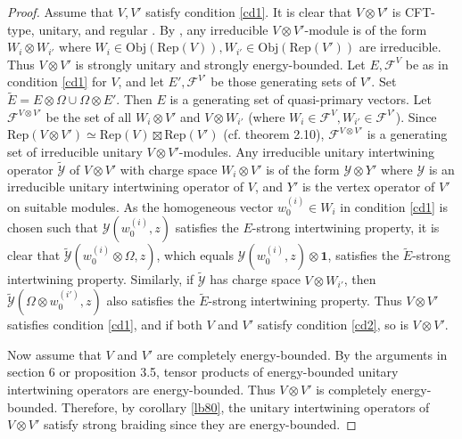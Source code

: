 \documentclass[11pt,b5paper,notitlepage]{article}
\theoremstyle{definition}
\theoremstyle{plain}
\newcommand{\mc}{\mathcal}
\newcommand{\wtd}{\widetilde}
\newcommand{\id}{\mathbf{1}}
\newcommand{\Rep}{\mathrm{Rep}}
\newcommand{\RepV}{\mathrm{Rep}(V)}
\newcommand{\Obj}{\mathrm{Obj}}
\numberwithin{equation}{subsection}
\begin{document}
\begin{proof}
Assume that $V,V'$ satisfy condition \ref{cd1}. It is clear that $V\otimes V'$ is CFT-type, unitary, and regular \cite{DLM97}. By \cite{FHL93}, any irreducible $V\otimes V'$-module is of the form $W_i\otimes W_{i'}$ where $W_i\in\Obj(\RepV),W_{i'}\in\Obj(\Rep(V'))$ are irreducible. Thus $V\otimes V'$ is strongly unitary and strongly energy-bounded. Let $E,\mc F^V$ be as in condition \ref{cd1} for $V$, and let $E',\mc F^{V'}$ be those generating sets of $V'$. Set $\wtd E=E\otimes \Omega\cup\Omega\otimes E'$. Then $E$ is a generating set of quasi-primary vectors. Let $\mc F^{V\otimes V'}$ be the set of all $W_i\otimes V'$ and $V\otimes W_{i'}$ (where $W_i\in\mc F^V,W_{i'}\in \mc F^{V'}$). Since $\Rep(V\otimes V')\simeq \Rep(V)\boxtimes \Rep(V')$ (cf. \cite{ADL05} theorem 2.10), $\mc F^{V\otimes V'}$ is a generating set of irreducible unitary $V\otimes V'$-modules. Any irreducible unitary intertwining operator $\wtd{\mc Y}$ of $V\otimes V'$ with charge space $W_i\otimes V'$ is of the form $\mc Y\otimes Y'$ where $\mc Y$ is an irreducible unitary intertwining operator of $V$, and $Y'$ is the vertex operator of $V'$ on suitable modules. As the homogeneous vector $w^{(i)}_0\in W_i$ in condition \ref{cd1} is chosen such that $\mc Y(w^{(i)}_0,z)$ satisfies the $E$-strong intertwining property, it is clear that $\wtd {\mc Y}(w^{(i)}_0\otimes\Omega,z)$, which equals $\mc Y(w^{(i)}_0,z)\otimes\id$, satisfies the $\wtd E$-strong intertwining property. Similarly, if $\wtd{\mc Y}$ has charge space $V\otimes W_{i'}$, then $\wtd{\mc Y}(\Omega\otimes w^{(i')}_0,z)$ also satisfies the $\wtd E$-strong intertwining property. Thus $V\otimes V'$ satisfies condition \ref{cd1}, and if both $V$ and $V'$ satisfy condition \ref{cd2}, so is $V\otimes V'$.

Now assume that $V$ and $V'$ are completely energy-bounded. By the arguments in \cite{CKLW18} section 6 or \cite{Gui19a} proposition 3.5, tensor products of energy-bounded unitary intertwining operators are energy-bounded. Thus $V\otimes V'$ is completely energy-bounded. Therefore, by corollary \ref{lb80}, the unitary intertwining operators of $V\otimes V'$ satisfy strong braiding since they are energy-bounded.
\end{proof}
\end{document}
